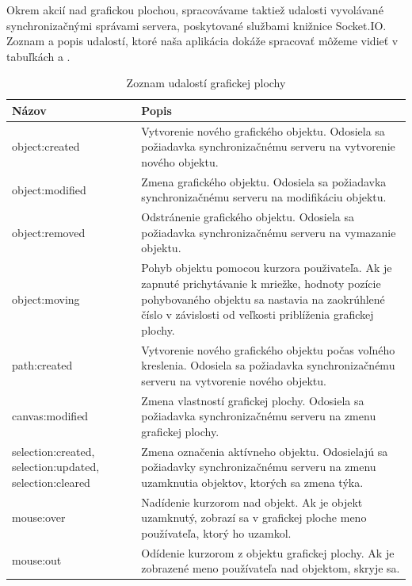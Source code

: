 Okrem akcií nad grafickou plochou, spracovávame taktiež udalosti vyvolávané synchronizačnými správami servera, poskytované službami knižnice Socket.IO. Zoznam a popis udalostí, ktoré naša aplikácia dokáže spracovať môžeme vidieť v tabuľkách  a .

\begin{table}
	\begin{tabular}{ | m{4cm} | m{8.5cm} | } \hline
		\textbf{Názov} & \textbf{Popis} \\ \hline \hline
		
		object:created & Vytvorenie nového grafického objektu. Odosiela sa požiadavka synchronizačnému serveru na vytvorenie nového objektu. \\\hline
		object:modified & Zmena grafického objektu. Odosiela sa požiadavka synchronizačnému serveru na modifikáciu objektu. \\\hline
		object:removed & Odstránenie grafického objektu. Odosiela sa požiadavka synchronizačnému serveru na vymazanie objektu.  \\\hline
		object:moving & Pohyb objektu pomocou kurzora použivateľa. Ak je zapnuté prichytávanie k mriežke, hodnoty pozície pohybovaného objektu sa nastavia na zaokrúhlené číslo v závislosti od veľkosti priblíženia grafickej plochy.  \\\hline
		path:created & Vytvorenie nového grafického objektu počas voľného kreslenia. Odosiela sa požiadavka synchronizačnému serveru na vytvorenie nového objektu. \\\hline
		canvas:modified & Zmena vlastností grafickej plochy. Odosiela sa požiadavka synchronizačnému serveru na zmenu grafickej plochy. \\\hline
		selection:created, selection:updated, selection:cleared & Zmena označenia aktívneho objektu. Odosielajú sa požiadavky synchronizačnému serveru na zmenu uzamknutia objektov, ktorých sa zmena týka. \\\hline
		mouse:over & Nadídenie kurzorom nad objekt. Ak je objekt uzamknutý, zobrazí sa v grafickej ploche meno používateľa, ktorý ho uzamkol. \\\hline
		mouse:out & Odídenie kurzorom z objektu grafickej plochy. Ak je zobrazené meno používateľa nad objektom, skryje sa. \\\hline
		
		\hline
	\end{tabular}
	\caption{Zoznam udalostí grafickej plochy}
	\label{tab:editor-events}
\end{table}

